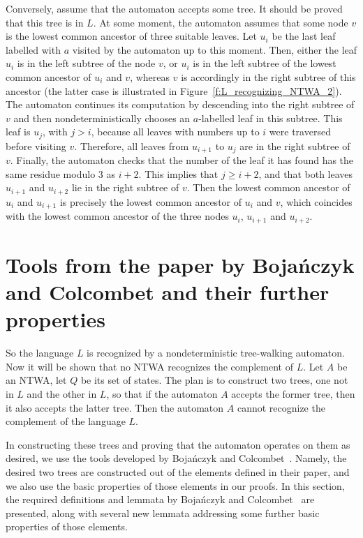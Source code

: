 \documentclass[12pt,a4paper]{article}
\theoremstyle{definition}
\begin{document}
Conversely, assume that the automaton accepts some tree.
It should be proved that this tree is in $L$.
At some moment, the automaton assumes that some node $v$
is the lowest common ancestor of three suitable leaves.
Let $u_i$ be the last leaf labelled with $a$ visited by the automaton up to this moment.
Then, either the leaf $u_i$ is in the left subtree of the node $v$,
or $u_i$ is in the left subtree of the lowest common ancestor of $u_i$ and $v$,
whereas $v$ is accordingly in the right subtree of this ancestor
(the latter case is illustrated in Figure~\ref{f:L_recognizing_NTWA_2}).
The automaton continues its computation by descending into the right subtree of $v$
and then nondeterministically chooses an $a$-labelled leaf in this subtree.
This leaf is $u_j$, with $j>i$,
because all leaves with numbers up to $i$ were traversed before visiting $v$.
Therefore, all leaves from $u_{i+1}$ to $u_j$ are in the right subtree of $v$.
Finally, the automaton checks that the number of the leaf it has found
has the same residue modulo $3$ as $i+2$.
This implies that $j \geqslant i+2$,
and that both leaves $u_{i+1}$ and $u_{i+2}$ lie in the right subtree of $v$.
Then the lowest common ancestor of $u_i$ and $u_{i+1}$
is precisely the lowest common ancestor of $u_i$ and $v$,
which coincides with the lowest common ancestor of the three nodes $u_i$, $u_{i+1}$ and $u_{i+2}$.







\section{Tools from the paper by Boja\'nczyk and Colcombet and their further properties}
\label{section_methods_BojanczykColcombet}

So the language $L$ is recognized by a nondeterministic tree-walking automaton.
Now it will be shown that no NTWA recognizes the complement of $L$.
Let $A$ be an NTWA, let $Q$ be its set of states.
The plan is to construct two trees, one not in $L$ and the other in $L$,
so that if the automaton $A$ accepts the former tree,
then it also accepts the latter tree.
Then the automaton $A$ cannot recognize the complement of the language $L$.

In constructing these trees and proving that the automaton operates on them as desired,
we use the tools developed by Boja\'nczyk and Colcombet~\cite{BojanczykColcombet_reg}.
Namely, the desired two trees are constructed out of the elements defined in their paper,
and we also use the basic properties of those elements in our proofs.
In this section, the required definitions and lemmata
by Boja\'nczyk and Colcombet~\cite{BojanczykColcombet_reg}
are presented,
along with several new lemmata addressing some further basic properties of those elements.
\end{document}
